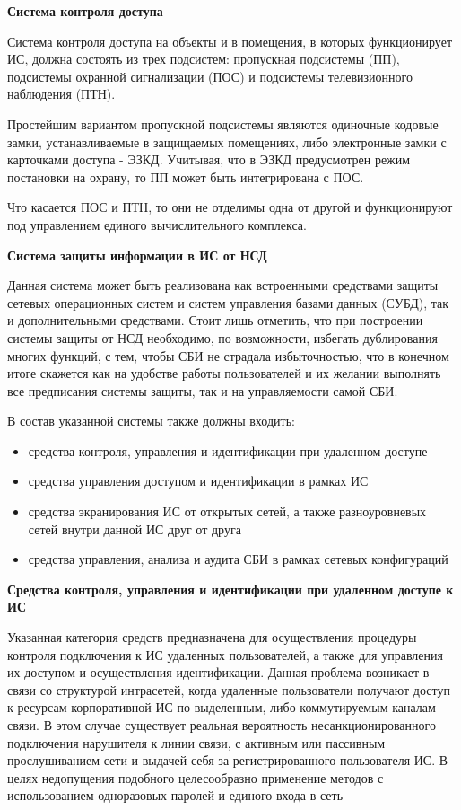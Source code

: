 \bigbreak
\textbf{Система контроля доступа}

Система контроля доступа на объекты и в помещения, в которых функционирует ИС, должна состоять из трех подсистем:
пропускная подсистемы (ПП), подсистемы охранной сигнализации (ПОС) и подсистемы телевизионного наблюдения (ПТН).

Простейшим вариантом пропускной подсистемы являются одиночные кодовые замки, устанавливаемые в защищаемых помещениях,
либо электронные замки с карточками доступа - ЭЗКД. Учитывая, что в ЭЗКД предусмотрен режим постановки
на охрану, то ПП может быть интегрирована с ПОС.

Что касается ПОС и ПТН, то они не отделимы одна от другой и функционируют под управлением единого вычислительного комплекса.

\bigbreak
\textbf{Система защиты информации в ИС от НСД}

Данная система может быть реализована как встроенными средствами защиты сетевых операционных
систем и систем управления базами данных (СУБД), так и дополнительными средствами. Стоит лишь отметить,
что при построении системы защиты от НСД необходимо, по возможности, избегать дублирования многих функций,
с тем, чтобы СБИ не страдала избыточностью, что в конечном итоге скажется как на удобстве работы
пользователей и их желании выполнять все предписания системы защиты, так и на управляемости самой СБИ.

В состав указанной системы также должны входить:
\begin{itemize}
    \item средства контроля, управления и идентификации при удаленном доступе
    \item средства управления доступом и идентификации в рамках ИС
    \item средства экранирования ИС от открытых сетей, а также разноуровневых сетей внутри данной ИС друг от друга
    \item средства управления, анализа и аудита СБИ в рамках сетевых конфигураций
\end{itemize}

\bigbreak
\textbf{Средства контроля, управления и идентификации при удаленном доступе к ИС}

Указанная категория средств предназначена для осуществления процедуры контроля подключения к ИС удаленных пользователей,
а также для управления их доступом и осуществления идентификации. Данная проблема возникает в связи со структурой
интрасетей, когда удаленные пользователи получают доступ к ресурсам корпоративной ИС по выделенным,
либо коммутируемым каналам связи. В этом случае существует реальная вероятность несанкционированного подключения
нарушителя к линии связи, с активным или пассивным прослушиванием сети и выдачей себя за
регистрированного пользователя ИС. В целях недопущения подобного целесообразно применение методов с
использованием одноразовых паролей и единого входа в сеть

